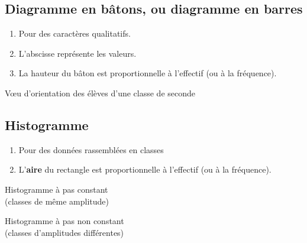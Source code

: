 \subsection{Diagramme en bâtons, ou diagramme en barres}

\begin{multicols}{2}
\begin{enumerate}
\item Pour des caractères qualitatifs.
\item L'abscisse représente les valeurs.
\item La hauteur du bâton est proportionnelle à l'effectif (ou à la fréquence).
\end{enumerate}

\begin{example}
Vœu d'orientation des élèves d'une classe de seconde
  \begin{center}
  \end{center}    
\end{example}
\end{multicols}

\subsection{Histogramme}

\begin{enumerate}
\item Pour des données rassemblées en classes
\item L'\textbf{aire} du rectangle est proportionnelle à l'effectif (ou à la
fréquence). 
\end{enumerate}

\begin{multicols}{2}
  \begin{center}
    Histogramme à pas constant \\
    (classes de même amplitude)     
  \end{center}

  \columnbreak

  \begin{center}
    Histogramme à pas non constant \\
    (classes d'amplitudes différentes)
  \end{center}
  
\end{multicols}

